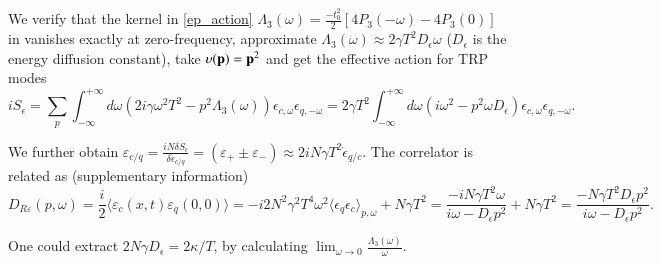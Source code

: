 \documentclass[twocolumn,floatfix,superscriptaddress]{revtex4-1}
\newcommand{\ket}{\rangle}
\newcommand{\bra}{\langle}
\newcommand{\pkpr}{P_3}
\newcommand{\TexBlue}[1]{ {\color{blue} #1}}
\begin{document}
\begin{widetext}
 We verify that the kernel in \eqref{ep_action} $\Lambda_3(\omega)=\frac{-t_0^2}{2}[4\pkpr(-\omega)-4\pkpr(0)] $ in   vanishes exactly at zero-frequency,  approximate $\Lambda_3(\omega)\approx 2\gamma T^2 D_\epsilon\omega$ ($D_\epsilon$ is the energy diffusion constant), take $\upsilon({\bf p})={\bf p}^2$  and get the effective action for TRP modes
 \begin{equation}
 iS_{\epsilon}=\sum_p\int_{-\infty}^{+\infty}d\omega ( 2i\gamma\omega^2T^2-p^2\Lambda_3(\omega))\epsilon_{c,\omega}\epsilon_{q,-\omega}=2\gamma T^2\int_{-\infty}^{+\infty} d\omega (i\omega^2-p^2 \omega D_{\epsilon} )\epsilon_{c,\omega}\epsilon_{q,-\omega}.
 \end{equation}
 
We further obtain $\varepsilon_{c/q}=\frac{iN\delta S_\epsilon}{\delta \dot\epsilon_{c/q}}=(\varepsilon_+\pm\varepsilon_-)\approx2iN\gamma T^2\dot \epsilon_{q/c}$. The correlator is related as (supplementary information)
\begin{equation}
D_{R\varepsilon}(p,\omega)=\frac{i}{2}\bra \varepsilon_c(x,t)\varepsilon_q(0,0)\ket=-i2N^2\gamma^2 T^4\omega^2 \bra \epsilon_q\epsilon_c\ket_{p,\omega}+N\gamma T^2=\frac{-iN\gamma T^2\omega}{i\omega-D_\epsilon p^2}+N\gamma T^2=\frac{-N\gamma T^2D_{\epsilon}p^2}{i\omega-D_{\epsilon}p^2}.
\end{equation}

One could extract $2N\gamma D_\epsilon=2\kappa/T$, by calculating $\lim_ {\omega\rightarrow 0} \frac{\Lambda_3(\omega)}{\omega}$.

  

\end{widetext}
\end{document}
